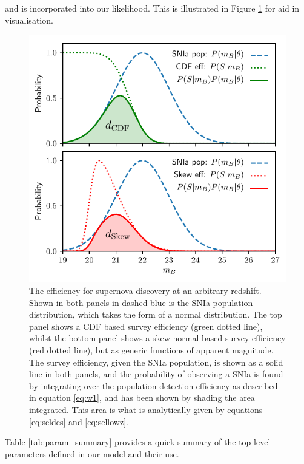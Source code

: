 \documentclass[a4paper,fleqn,usenatbib]{mnras}
\begin{document}
and is incorporated into our likelihood. This is illustrated in Figure \ref{fig:efficiency} for aid in visualisation.

\begin{figure}
	\begin{center}
		\includegraphics[width=\columnwidth]{efficiency.pdf}
	\end{center}
	\caption{The efficiency for supernova discovery at an arbitrary redshift. Shown in both panels in dashed blue is the SNIa population distribution, which takes the form of a normal distribution. The top panel shows a CDF based survey efficiency (green dotted line), whilst the bottom panel shows a skew normal based survey efficiency (red dotted line), but as generic functions of apparent magnitude. The survey efficiency, given the SNIa population, is shown as a solid line in both panels, and the probability of observing a SNIa is found by integrating over the population detection efficiency as described in equation \eqref{eq:w1}, and has been shown by shading the area integrated. This area is what is analytically given by equations \eqref{eq:seldes} and \eqref{eq:sellowz}.}
	\label{fig:efficiency}
\end{figure}

Table \ref{tab:param_summary} provides a quick summary of the top-level parameters defined in our model and their use.
\end{document}
